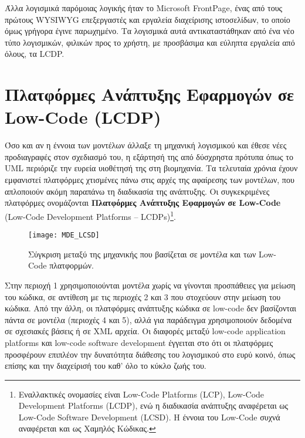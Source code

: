             Άλλα λογισμικά παρόμοιας λογικής ήταν το Microsoft FrontPage, ένας από τους πρώτους WYSIWYG επεξεργαστές και εργαλεία διαχείρισης ιστοσελίδων, το οποίο όμως γρήγορα έγινε παρωχημένο. Τα λογισμικά αυτά αντικαταστάθηκαν από ένα νέο τύπο λογισμικών, φιλικών προς το χρήστη, με προσβάσιμα και εύληπτα εργαλεία από όλους, τα LCDP. \cite{LowCodeSimon}

    \section{Πλατφόρμες Ανάπτυξης Εφαρμογών σε Low-Code (LCDP)}
        Όσο και αν η έννοια των μοντέλων άλλαξε τη μηχανική λογισμικού και έθεσε νέες προδιαγραφές στον σχεδιασμό του, η εξάρτησή της από δύσχρηστα πρότυπα όπως το UML περιόριζε την ευρεία υιοθέτησή της στη βιομηχανία. Τα τελευταία χρόνια έχουν εμφανιστεί πλατφόρμες χτισμένες πάνω στις αρχές της αφαίρεσης των μοντέλων, που απλοποιούν ακόμη παραπάνω τη διαδικασία της ανάπτυξης. Οι συγκεκριμένες πλατφόρμες ονομάζονται \textbf{Πλατφόρμες Ανάπτυξης Εφαρμογών σε Low-Code} (Low-Code Development Platforms -- LCDPs)\footnote{Εναλλακτικές ονομασίες είναι Low-Code Platforms (LCP), Low-Code Development Platforms (LCDP), ενώ η διαδικασία ανάπτυξης αναφέρεται ως Low-Code Software Development (LCSD). Η έννοια του Low-Code συχνά αναφέρεται και ως Χαμηλός Κώδικας.}.\cite{Bock2021}

        \begin{figure}[H] \noindent \centering
                \texttt{[image: MDE\_LCSD]}
                \caption{\centering Σύγκριση μεταξύ της μηχανικής που βασίζεται σε μοντέλα και των Low-Code πλατφορμών. \cite{MDELow}}
        \end{figure}

        \begin{displayquote}
            \small Στην περιοχή 1 χρησιμοποιούνται μοντέλα χωρίς να γίνονται προσπάθειες για μείωση του κώδικα, σε αντίθεση με τις περιοχές 2 και 3 που στοχεύουν στην μείωση του κώδικα. Από την άλλη, οι πλατφόρμες ανάπτυξης κώδικα σε low-code δεν βασίζονται πάντα σε μοντέλα (περιοχές 4 και 5), αλλά για παράδειγμα χρησιμοποιούν δεδομένα σε σχεσιακές βάσεις ή σε XML αρχεία. Οι διαφορές μεταξύ low-code application platforms και low-code software development έγγειται στο ότι οι πλατφόρμες προσφέρουν επιπλέον την δυνατότητα διάθεσης του λογισμικού στο ευρύ κοινό, όπως επίσης και την διαχείρισή του καθ' όλο το κύκλο ζωής του.
        \end{displayquote}

